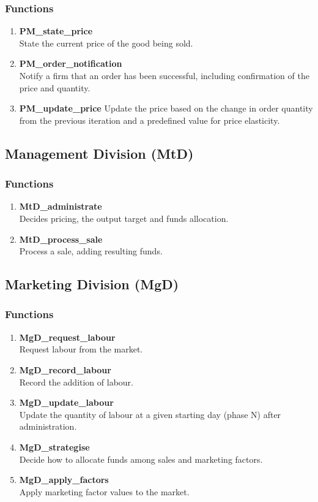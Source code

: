 \documentclass[11pt]{article}
\begin{document}
\subsubsection{Functions}
\begin{enumerate}
	\item \textbf{PM\_state\_price} \\
	State the current price of the good being sold.
	\item \textbf{PM\_order\_notification} \\
	Notify a firm that an order has been successful, including confirmation of the price and quantity.
	\item \textbf{PM\_update\_price}
	Update the price based on the change in order quantity from the previous iteration and a predefined value for price elasticity.
\end{enumerate}

\subsection{Management Division (MtD)}

\subsubsection{Functions}
\begin{enumerate}
	\item \textbf{MtD\_administrate} \\
	Decides pricing, the output target and funds allocation.
	\item \textbf{MtD\_process\_sale} \\
	Process a sale, adding resulting funds.
\end{enumerate}

\subsection{Marketing Division (MgD)}

\subsubsection{Functions}
\begin{enumerate}
	\item \textbf{MgD\_request\_labour} \\
	Request labour from the market.
	\item \textbf{MgD\_record\_labour} \\
	Record the addition of labour.
	\item \textbf{MgD\_update\_labour} \\
	Update the quantity of labour at a given starting day (phase N) after administration.
	\item \textbf{MgD\_strategise} \\
	Decide how to allocate funds among sales and marketing factors.
	\item \textbf{MgD\_apply\_factors} \\
	Apply marketing factor values to the market.
\end{enumerate}
\end{document}
